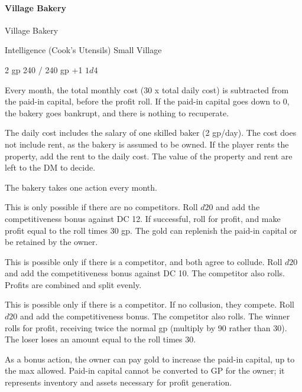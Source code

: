 \documentclass[twocolumn]{dndbook}
\begin{document}
\paragraph{Village Bakery}


\begin{DndMonster}[width=.5\textwidth - 8pt]{Village Bakery}

	\hfill Intelligence (Cook's Utensils)
	\hfill Small Village


	\hfill 2 gp
	\hfill 240 / 240 gp
	\hfill +1
	\hfill $1d4$

	Every month, the total monthly cost (30 x total daily cost) is subtracted
	from the paid-in capital, before the profit roll.
	If the paid-in capital goes down to 0, the bakery goes bankrupt,
	and there is nothing to recuperate.\par

	The daily cost includes the salary of one skilled baker (2 gp/day).
	The cost does not include rent, as the bakery is assumed to be owned.
	If the player rents the property, add the rent to the daily cost.
	The value of the property and rent are left to the DM to decide.\par

	The bakery takes one action every month.

	This is only possible if there are no competitors.
	Roll $d20$ and add the competitiveness bonus against DC 12.
	If successful, roll for profit, and make profit equal to the roll
	times 30 gp. The gold can replenish the paid-in capital or be retained by the owner.

	This is possible only if there is a competitor, and both agree to collude.
	Roll $d20$ and add the competitiveness bonus against DC 10.
	The competitor also rolls. Profits are combined and split evenly.

	This is possible only if there is a competitor. If no collusion, they compete.
	Roll $d20$ and add the competitiveness bonus.
	The competitor also rolls.
	The winner rolls for profit, receiving twice the normal gp (multiply by 90 rather than 30).
	The loser loses an amount equal to the roll times 30.

	As a bonus action, the owner can pay gold to increase
	the paid-in capital, up to the max allowed.
	Paid-in capital cannot be converted to GP for the owner; it represents inventory and assets necessary for profit generation.
\end{DndMonster}
\end{document}
